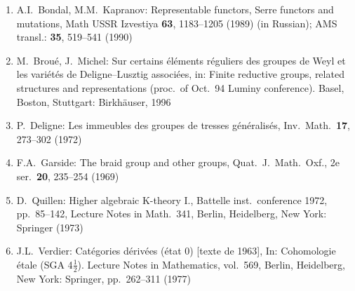 \documentclass[11pt,a4paper]{article}
\theoremstyle{plain}
\theoremstyle{definition}
\begin{document}
\begin{enumerate}[label={}]
\item A.I.\ Bondal, M.M.\ Kapranov: Representable functors, Serre functors and mutations, Math USSR Izvestiya \textbf{63}, 1183--1205 (1989) (in Russian); AMS transl.: \textbf{35}, 519--541 (1990)

\item M.\ Brou\'e, J.\ Michel: Sur certains \'el\'ements r\'eguliers des groupes de Weyl et les vari\'et\'es de Deligne--Lusztig associ\'ees, in: Finite reductive groups, related structures and representations (proc.\ of Oct.~94 Luminy conference). Basel, Boston, Stuttgart: Birkh\"auser, 1996

\item P.\ Deligne: Les immeubles des groupes de tresses g\'en\'eralis\'es, Inv.\ Math.\ \textbf{17}, 273--302 (1972)

\item F.A.\ Garside: The braid group and other groups, Quat.\ J.\ Math.\ Oxf., 2e ser.\ \textbf{20}, 235--254 (1969)

\item D.\ Quillen: Higher algebraic K-theory I., Battelle inst.\ conference 1972, pp.~85--142, Lecture Notes in Math.\ 341, Berlin, Heidelberg, New York: Springer (1973)

\item J.L.\ Verdier: Cat\'egories d\'eriv\'ees (\'etat 0) [texte de 1963], In: Cohomologie \'etale (SGA 4$\frac{1}{2}$). Lecture Notes in Mathematics, vol.\ 569, Berlin, Heidelberg, New York: Springer, pp.~262--311 (1977)
\end{enumerate}
\end{document}
